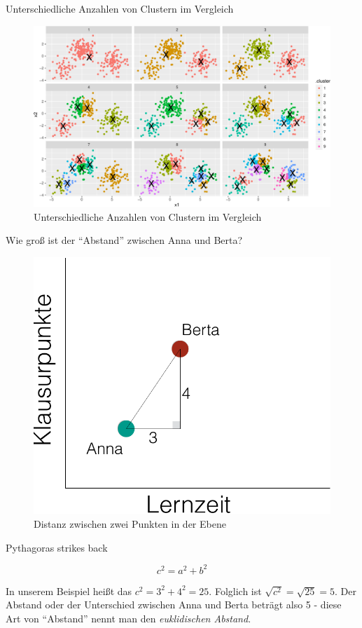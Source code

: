 \begin{frame}{Unterschiedliche Anzahlen von Clustern im Vergleich}

\begin{figure}

{\centering \includegraphics[width=0.8\linewidth]{PraDa_Folien_nm_2_files/figure-beamer/cluster3-1} 

}

\caption{Unterschiedliche Anzahlen von Clustern im Vergleich}\label{fig:cluster3}
\end{figure}

\end{frame}

\begin{frame}{Wie groß ist der ``Abstand'' zwischen Anna und Berta?}

\begin{figure}

{\centering \includegraphics[width=0.5\linewidth]{../images/cluster/distanz_crop} 

}

\caption{Distanz zwischen zwei Punkten in der Ebene}\label{fig:distanz}
\end{figure}

\end{frame}

\begin{frame}{Pythagoras strikes back}

\[c^2 = a^2 + b^2\]

In unserem Beispiel heißt das \(c^2 = 3^2+4^2 = 25\). Folglich ist
\(\sqrt{c^2}=\sqrt{25}=5\). Der Abstand oder der Unterschied zwischen
Anna und Berta beträgt also 5 - diese Art von ``Abstand'' nennt man den
\emph{euklidischen Abstand}.

\end{frame}

